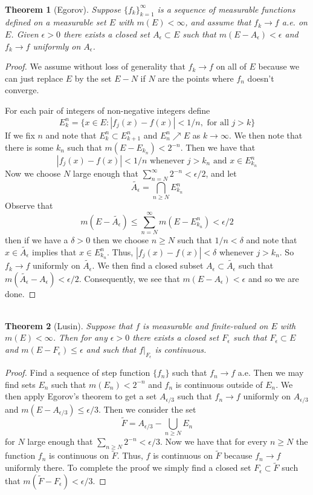 \documentclass{article}
\DeclareMathOperator{\suchthat}{\mathrel{:}}
\newtheorem*{thm}{\\ Theorem}
\begin{document}
\begin{thm}[Egorov]
  Suppose $\{f_k\}_{k=1}^\infty$ is a sequence of measurable functions defined
  on a measurable set $E$ with $m(E) < \infty$, and assume that $f_k \to f$
  a.e. on $E$. Given $\epsilon > 0$ there exists a closed set $A_\epsilon
  \subset E$ such that $m(E - A_\epsilon) < \epsilon$ and $f_k \to f$
  uniformly on $A_\epsilon$.
\end{thm}
\begin{proof}
  We assume without loss of generality that $f_k \to f$ on all of $E$ because
  we can just replace $E$ by the set $E - N$ if $N$ are the points where
  $f_n$ doesn't converge.

  For each pair of integers of non-negative integers define
  \[
  E_k^n = \{x \in E \suchthat |f_j(x) - f(x)| < 1/n, \text{ for all } j > k\}
  \]
  If we fix $n$ and note that $E_k^n \subset E_{k+1}^n$ and $E_n^n \nearrow
  E$ as $k \to \infty$. We then note that there is some $k_n$ such that
  $m(E - E_{k_n}) < 2^{-n}$. Then we have that
  \[
  |f_j(x) - f(x)| < 1/n \text{ whenever } j > k_n \text{ and } x \in E_{k_n}^n
  \]
  Now we choose $N$ large enough that $\sum_{n=N}^\infty 2^{-n} < \epsilon/2$,
  and let
  \[
   \tilde{A_\epsilon} = \bigcap_{n\geq N} E_{k_n}^n
  \]
  Observe that
  \[
  m(E - \tilde{A_\epsilon}) \leq \sum_{n=N}^\infty m(E - E_{k_n}^n) < \epsilon/2
  \]
  then if we have a $\delta > 0$ then we choose $n \geq N$ such that $1/n <
  \delta$ and note that $x\in \tilde{A_\epsilon}$ implies that $x \in E_{k_n}^n
  $. Thus, $|f_j(x) - f(x)| < \delta$ whenever $j > k_n$. So $f_k \to f$
  uniformly on $\tilde{A_\epsilon}$. We then find a closed subset $A_\epsilon
  \subset \tilde{A_\epsilon}$ such that $m(\tilde{A_\epsilon} - A_\epsilon) <
  \epsilon/2$. Consequently, we see that $m(E - A_\epsilon) < \epsilon$ and so
  we are done.
\end{proof}

\begin{thm}[Lusin]
  Suppose that $f$ is measurable and finite-valued on $E$ with $m(E) < \infty
  $. Then for any $\epsilon > 0$ there exists a closed set $F_\epsilon$ such
  that $F_\epsilon \subset E$ and $m(E - F_\epsilon) \leq \epsilon$ and such
  that $f|_{F_\epsilon}$ is continuous.
\end{thm}
\begin{proof}
  Find a sequence of step function $\{f_n\}$ such that $f_n \to f$ a.e.
  Then we may find sets $E_n$ such that $m(E_n) < 2^{-n}$ and $f_n$ is
  continuous outside of $E_n$. We then apply Egorov's theorem to get a
  set $A_{\epsilon/3}$ such that $f_n \to f$ uniformly on $A_{\epsilon/3}$ and
  $m(E - A_{\epsilon/3}) \leq \epsilon/3$. Then we consider the set
  \[
  \tilde{F} = A_{\epsilon/3} - \bigcup_{n\geq N}E_n
  \]
  for $N$ large enough that $\sum_{n\geq N} 2^{-n} < \epsilon/3$. Now we have
  that for every $n \geq N$ the function $f_n$ is continuous on $\tilde{F}$.
  Thus, $f$ is continuous on $\tilde{F}$ because $f_n \to f$ uniformly there.
  To complete the proof we simply find a closed set $F_\epsilon \subset
  \tilde{F}$ such that $m(\tilde{F} - F_\epsilon) < \epsilon/3$.
\end{proof}
\end{document}
